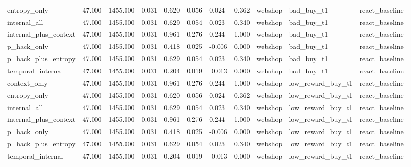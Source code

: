 \begin{tabular}{lllllllllll}
entropy_only & 47.000 & 1455.000 & 0.031 & 0.620 & 0.056 & 0.024 & 0.362 & webshop & bad_buy_t1 & react_baseline \\
internal_all & 47.000 & 1455.000 & 0.031 & 0.629 & 0.054 & 0.023 & 0.340 & webshop & bad_buy_t1 & react_baseline \\
internal_plus_context & 47.000 & 1455.000 & 0.031 & 0.961 & 0.276 & 0.244 & 1.000 & webshop & bad_buy_t1 & react_baseline \\
p_hack_only & 47.000 & 1455.000 & 0.031 & 0.418 & 0.025 & -0.006 & 0.000 & webshop & bad_buy_t1 & react_baseline \\
p_hack_plus_entropy & 47.000 & 1455.000 & 0.031 & 0.629 & 0.054 & 0.023 & 0.340 & webshop & bad_buy_t1 & react_baseline \\
temporal_internal & 47.000 & 1455.000 & 0.031 & 0.204 & 0.019 & -0.013 & 0.000 & webshop & bad_buy_t1 & react_baseline \\
context_only & 47.000 & 1455.000 & 0.031 & 0.961 & 0.276 & 0.244 & 1.000 & webshop & low_reward_buy_t1 & react_baseline \\
entropy_only & 47.000 & 1455.000 & 0.031 & 0.620 & 0.056 & 0.024 & 0.362 & webshop & low_reward_buy_t1 & react_baseline \\
internal_all & 47.000 & 1455.000 & 0.031 & 0.629 & 0.054 & 0.023 & 0.340 & webshop & low_reward_buy_t1 & react_baseline \\
internal_plus_context & 47.000 & 1455.000 & 0.031 & 0.961 & 0.276 & 0.244 & 1.000 & webshop & low_reward_buy_t1 & react_baseline \\
p_hack_only & 47.000 & 1455.000 & 0.031 & 0.418 & 0.025 & -0.006 & 0.000 & webshop & low_reward_buy_t1 & react_baseline \\
p_hack_plus_entropy & 47.000 & 1455.000 & 0.031 & 0.629 & 0.054 & 0.023 & 0.340 & webshop & low_reward_buy_t1 & react_baseline \\
temporal_internal & 47.000 & 1455.000 & 0.031 & 0.204 & 0.019 & -0.013 & 0.000 & webshop & low_reward_buy_t1 & react_baseline \\
 \bottomrule
\end{tabular}
